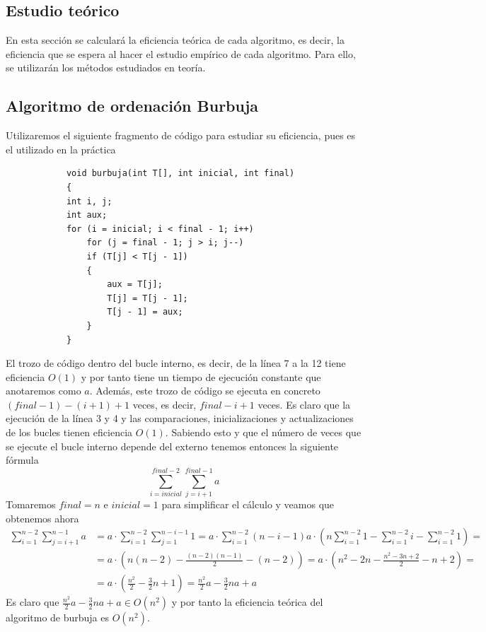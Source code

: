 \documentclass[11pt]{article}
\begin{document}
    \subsection{Estudio teórico}
        En esta sección se calculará la eficiencia teórica de cada algoritmo, es decir, la eficiencia que se espera al hacer el
        estudio empírico de cada algoritmo. Para ello, se utilizarán los métodos estudiados en teoría.
        \subsection*{Algoritmo de ordenación Burbuja}
        Utilizaremos el siguiente fragmento de código para estudiar su eficiencia, pues es el utilizado en la práctica
        \begin{lstlisting}
            void burbuja(int T[], int inicial, int final)
            {
            int i, j;
            int aux;
            for (i = inicial; i < final - 1; i++)
                for (j = final - 1; j > i; j--)
                if (T[j] < T[j - 1])
                {
                    aux = T[j];
                    T[j] = T[j - 1];
                    T[j - 1] = aux;
                }
            }
        \end{lstlisting}
        El trozo de código dentro del bucle interno, es decir, de la línea 7 a la 12 tiene eficiencia $O(1)$ y por tanto
        tiene un tiempo de ejecución constante que anotaremos como $a$. Además, este trozo de código se ejecuta
        en concreto $(final-1)-(i+1) +1$ veces, es decir, $final-i+1$ veces. Es claro que la ejecución de la línea 3 y 4 
        y las comparaciones, inicializaciones y actualizaciones de los bucles tienen eficiencia $O(1)$. Sabiendo esto y que 
        el número de veces que se ejecute el bucle interno depende del externo tenemos entonces la siguiente fórmula 
        \begin{equation*}
            \sum_{i=inicial}^{final-2} \sum_{j=i+1}^{final-1}a 
        \end{equation*}
        Tomaremos $final =  n$ e $inicial = 1$ para simplificar el cálculo y veamos que obtenemos ahora
        \begin{equation*}\begin{split}
            \sum_{i=1}^{n-2} \sum_{j=i+1}^{n-1}a&= a \cdot \sum_{i=1}^{n-2} \sum_{j=1}^{n-i-1}1
             = a \cdot \sum_{i=1}^{n-2} (n-i-1) a \cdot ( n\sum_{i=1}^{n-2} 1 - \sum_{i=1}^{n-2} i - \sum_{i=1}^{n-2} 1)= \\
            &= a \cdot ( n(n-2) - \frac{(n-2)(n-1)}{2} - (n-2))= a \cdot ( n^2-2n - \frac{n^2-3n+2}{2} - n+2)=\\
            &= a \cdot \left(\frac{n^2}{2}-\frac{3}{2}n+1\right)= \frac{n^2}{2}a-\frac{3}{2}na+a
        \end{split}\end{equation*}
        Es claro que $\frac{n^2}{2}a-\frac{3}{2}na+a \in O(n^2)$ y por tanto la eficiencia teórica del algoritmo de burbuja es $O(n^2)$.
\end{document}
